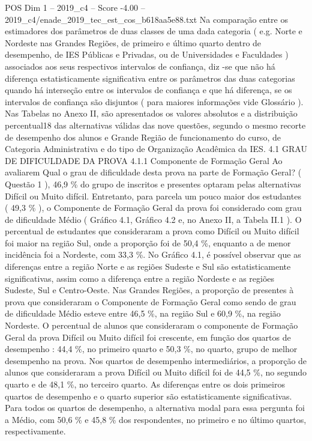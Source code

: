 \begin{textsample}{POS Dim 1 – 2019\_c4 – Score -4.00 – 2019\_c4/enade\_2019\_tec\_est\_cos\_b618aa5e88.txt}
Na comparação entre os estimadores dos parâmetros de duas classes de uma dada categoria ( e.g.
Norte e Nordeste nas Grandes Regiões, de primeiro e último quarto dentro de desempenho, de IES Públicas e Privadas, ou de Universidades e Faculdades ) associados aos seus respectivos intervalos de confiança, diz -se que não há diferença estatisticamente significativa entre os parâmetros das duas categorias quando há interseção entre os intervalos de confiança e que há diferença, se os intervalos de confiança são disjuntos ( para maiores informações vide Glossário ).
Nas Tabelas no Anexo II, são apresentados os valores absolutos e a distribuição percentual18 das alternativas válidas das nove questões, segundo o mesmo recorte de desempenho dos alunos e Grande Região de funcionamento do curso, de Categoria Administrativa e do tipo de Organização Acadêmica da IES. 4.1 GRAU DE DIFICULDADE DA PROVA 4.1.1 Componente de Formação Geral Ao avaliarem Qual o grau de dificuldade desta prova na parte de Formação Geral? ( Questão 1 ), 46,9 \% do grupo de inscritos e presentes optaram pelas alternativas Difícil ou Muito difícil.
Entretanto, para parcela um pouco maior dos estudantes ( 49,3 \% ), o Componente de Formação Geral da prova foi considerado com grau de dificuldade Médio ( Gráfico 4.1, Gráfico 4.2 e, no Anexo II, a Tabela II.1 ).
O percentual de estudantes que consideraram a prova como Difícil ou Muito difícil foi maior na região Sul, onde a proporção foi de 50,4 \%, enquanto a de menor incidência foi a Nordeste, com 33,3 \%.
No Gráfico 4.1, é possível observar que as diferenças entre a região Norte e as regiões Sudeste e Sul são estatisticamente significativas, assim como a diferença entre a região Nordeste e as regiões Sudeste, Sul e Centro-Oeste.
Nas Grandes Regiões, a proporção de presentes à prova que consideraram o Componente de Formação Geral como sendo de grau de dificuldade Médio esteve entre 46,5 \%, na região Sul e 60,9 \%, na região Nordeste.
O percentual de alunos que consideraram o componente de Formação Geral da prova Difícil ou Muito difícil foi crescente, em função dos quartos de desempenho : 44,4 \%, no primeiro quarto e 50,3 \%, no quarto, grupo de melhor desempenho na prova.
Nos quartos de desempenho intermediários, a proporção de alunos que consideraram a prova Difícil ou Muito difícil foi de 44,5 \%, no segundo quarto e de 48,1 \%, no terceiro quarto.
As diferenças entre os dois primeiros quartos de desempenho e o quarto superior são estatisticamente significativas.
Para todos os quartos de desempenho, a alternativa modal para essa pergunta foi a Médio, com 50,6 \% e 45,8 \% dos respondentes, no primeiro e no último quartos, respectivamente.

\end{textsample}
